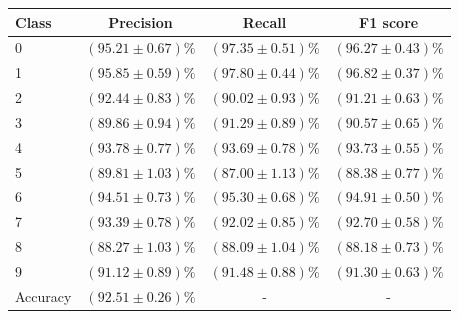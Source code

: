 \begin{tabular}{l|c|c|c}
\hline
Class &  Precision & Recall & F1 score \\
\hline
0 & $(95.21 \pm 0.67)\%$ & $(97.35 \pm 0.51)\%$ & $(96.27 \pm 0.43)\%$ \\
1 & $(95.85 \pm 0.59)\%$ & $(97.80 \pm 0.44)\%$ & $(96.82 \pm 0.37)\%$ \\
2 & $(92.44 \pm 0.83)\%$ & $(90.02 \pm 0.93)\%$ & $(91.21 \pm 0.63)\%$ \\
3 & $(89.86 \pm 0.94)\%$ & $(91.29 \pm 0.89)\%$ & $(90.57 \pm 0.65)\%$ \\
4 & $(93.78 \pm 0.77)\%$ & $(93.69 \pm 0.78)\%$ & $(93.73 \pm 0.55)\%$ \\
5 & $(89.81 \pm 1.03)\%$ & $(87.00 \pm 1.13)\%$ & $(88.38 \pm 0.77)\%$ \\
6 & $(94.51 \pm 0.73)\%$ & $(95.30 \pm 0.68)\%$ & $(94.91 \pm 0.50)\%$ \\
7 & $(93.39 \pm 0.78)\%$ & $(92.02 \pm 0.85)\%$ & $(92.70 \pm 0.58)\%$ \\
8 & $(88.27 \pm 1.03)\%$ & $(88.09 \pm 1.04)\%$ & $(88.18 \pm 0.73)\%$ \\
9 & $(91.12 \pm 0.89)\%$ & $(91.48 \pm 0.88)\%$ & $(91.30 \pm 0.63)\%$ \\
\hline
Accuracy & $(92.51 \pm 0.26)\%$ & - & - \\
\hline
\end{tabular}
